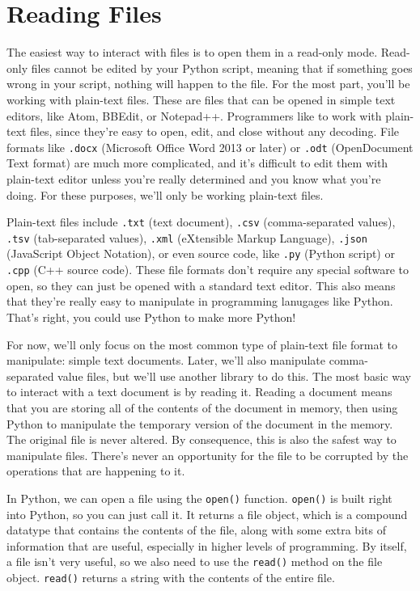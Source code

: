 \section{Reading Files}
The easiest way to interact with files is to open them in a read-only mode. Read-only files cannot be edited by your Python script, meaning that if something goes wrong in your script, nothing will happen to the file. For the most part, you'll be working with plain-text files. These are files that can be opened in simple text editors, like Atom, BBEdit, or Notepad++. Programmers like to work with plain-text files, since they're easy to open, edit, and close without any decoding. File formats like \verb|.docx| (Microsoft Office Word 2013 or later) or \verb|.odt| (OpenDocument Text format) are much more complicated, and it's difficult to edit them with plain-text editor unless you're really determined and you know what you're doing. For these purposes, we'll only be working plain-text files.\par
Plain-text files include \verb|.txt| (text document), \verb|.csv| (comma-separated values), \verb|.tsv| (tab-separated values), \verb|.xml| (eXtensible Markup Language), \verb|.json| (JavaScript Object Notation), or even source code, like \verb|.py| (Python script) or \verb|.cpp| (C++ source code). These file formats don't require any special software to open, so they can just be opened with a standard text editor. This also means that they're really easy to manipulate in programming lanugages like Python. That's right, you could use Python to make more Python!\par
For now, we'll only focus on the most common type of plain-text file format to manipulate: simple text documents. Later, we'll also manipulate comma-separated value files, but we'll use another library to do this. The most basic way to interact with a text document is by reading it. Reading a document means that you are storing all of the contents of the document in memory, then using Python to manipulate the temporary version of the document in the memory. The original file is never altered. By consequence, this is also the safest way to manipulate files. There's never an opportunity for the file to be corrupted by the operations that are happening to it.\par
In Python, we can open a file using the \verb|open()| function. \verb|open()| is built right into Python, so you can just call it. It returns a file object, which is a compound datatype that contains the contents of the file, along with some extra bits of information that are useful, especially in higher levels of programming. By itself, a file isn't very useful, so we also need to use the \verb|read()| method on the file object. \verb|read()| returns a string with the contents of the entire file.\par

